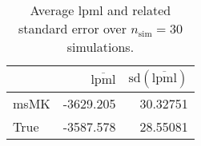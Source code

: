 \begin{table}[H]

\caption{Average lpml and related standard error over $n_{\text{sim}} = 30$ simulations.}
\centering
\begin{tabular}[t]{lrr}
\toprule
  & $\overbar{\text{lpml}}$ & $\text{sd}(\overbar{\text{lpml}})$\\
\midrule
msMK & -3629.205 & 30.32751\\
True & -3587.578 & 28.55081\\
\bottomrule
\end{tabular}
\end{table}